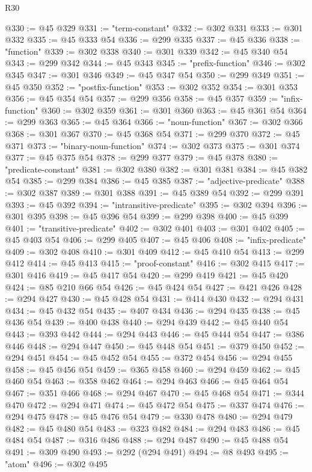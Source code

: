 \begin{lexlean}{R30}
\begin{coremodule}
@330 := @45 @329
@331 := "term-constant"
@332 := @302 @331
@333 := @301 @332
@335 := @45 @333 @54
@336 := @299 @335
@337 := @45 @336
@338 := "function"
@339 := @302 @338
@340 := @301 @339
@342 := @45 @340 @54
@343 := @299 @342
@344 := @45 @343
@345 := "prefix-function"
@346 := @302 @345
@347 := @301 @346
@349 := @45 @347 @54
@350 := @299 @349
@351 := @45 @350
@352 := "postfix-function"
@353 := @302 @352
@354 := @301 @353
@356 := @45 @354 @54
@357 := @299 @356
@358 := @45 @357
@359 := "infix-function"
@360 := @302 @359
@361 := @301 @360
@363 := @45 @361 @54
@364 := @299 @363
@365 := @45 @364
@366 := "noun-function"
@367 := @302 @366
@368 := @301 @367
@370 := @45 @368 @54
@371 := @299 @370
@372 := @45 @371
@373 := "binary-noun-function"
@374 := @302 @373
@375 := @301 @374
@377 := @45 @375 @54
@378 := @299 @377
@379 := @45 @378
@380 := "predicate-constant"
@381 := @302 @380
@382 := @301 @381
@384 := @45 @382 @54
@385 := @299 @384
@386 := @45 @385
@387 := "adjective-predicate"
@388 := @302 @387
@389 := @301 @388
@391 := @45 @389 @54
@392 := @299 @391
@393 := @45 @392
@394 := "intransitive-predicate"
@395 := @302 @394
@396 := @301 @395
@398 := @45 @396 @54
@399 := @299 @398
@400 := @45 @399
@401 := "transitive-predicate"
@402 := @302 @401
@403 := @301 @402
@405 := @45 @403 @54
@406 := @299 @405
@407 := @45 @406
@408 := "infix-predicate"
@409 := @302 @408
@410 := @301 @409
@412 := @45 @410 @54
@413 := @299 @412
@414 := @45 @413
@415 := "proof-constant"
@416 := @302 @415
@417 := @301 @416
@419 := @45 @417 @54
@420 := @299 @419
@421 := @45 @420
@424 := @85 @210 @66 @54
@426 := @45 @424 @54
@427 := @421 @426
@428 := @294 @427
@430 := @45 @428 @54
@431 := @414 @430
@432 := @294 @431
@434 := @45 @432 @54
@435 := @407 @434
@436 := @294 @435
@438 := @45 @436 @54
@439 := @400 @438
@440 := @294 @439
@442 := @45 @440 @54
@443 := @393 @442
@444 := @294 @443
@446 := @45 @444 @54
@447 := @386 @446
@448 := @294 @447
@450 := @45 @448 @54
@451 := @379 @450
@452 := @294 @451
@454 := @45 @452 @54
@455 := @372 @454
@456 := @294 @455
@458 := @45 @456 @54
@459 := @365 @458
@460 := @294 @459
@462 := @45 @460 @54
@463 := @358 @462
@464 := @294 @463
@466 := @45 @464 @54
@467 := @351 @466
@468 := @294 @467
@470 := @45 @468 @54
@471 := @344 @470
@472 := @294 @471
@474 := @45 @472 @54
@475 := @337 @474
@476 := @294 @475
@478 := @45 @476 @54
@479 := @330 @478
@480 := @294 @479
@482 := @45 @480 @54
@483 := @323 @482
@484 := @294 @483
@486 := @45 @484 @54
@487 := @316 @486
@488 := @294 @487
@490 := @45 @488 @54
@491 := @309 @490
@493 := @292 (@294 @491)
@494 := @8 @493
@495 := "atom"
@496 := @302 @495

\end{coremodule}
\end{lexlean}
